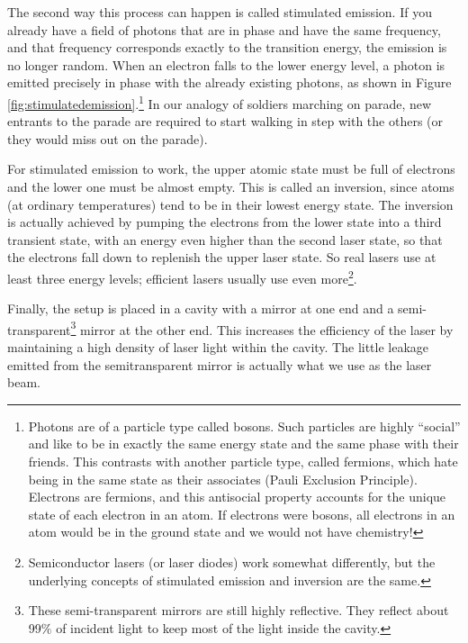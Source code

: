 The second way this process can happen is called stimulated emission. If you already have a field of photons that are in phase and have the same frequency, and that frequency corresponds exactly to the transition energy, the emission is no longer random. When an electron falls to the lower energy level, a photon is emitted precisely in phase with the already existing photons, as shown in Figure {\ref{fig:stimulatedemission}}.\footnote{Photons are of a particle type called bosons. Such particles are highly ``social'' and like to be in exactly the same energy state and the same phase with their friends. This contrasts with another particle type, called fermions, which hate being in the same state as their associates (Pauli Exclusion Principle). Electrons are fermions, and this antisocial property accounts for the unique state of each electron in an atom. If electrons were bosons, all electrons in an atom would be in the ground state and we would not have chemistry!} In our analogy of soldiers marching on parade, new entrants to the parade are required to start walking in step with the others (or they would miss out on the parade).\myskip

For stimulated emission to work, the upper atomic state must be full of electrons and the lower one must be almost empty. This is called an inversion, since atoms (at ordinary temperatures) tend to be in their lowest energy state. The inversion is actually achieved by pumping the electrons from the lower state into a third transient state, with an energy even higher than the second laser state, so that the electrons fall down to replenish the upper laser state. So real lasers use at least three energy levels; efficient lasers usually use even more\footnote{Semiconductor lasers (or laser diodes) work somewhat differently, but the underlying concepts of stimulated emission and inversion are the same.}.\myskip

Finally, the setup is placed in a cavity with a mirror at one end and a semi-transparent\footnote{These semi-transparent mirrors are still highly reflective. They reflect about 99$\%$ of incident light to keep most of the light inside the cavity.} mirror at the other end. This increases the efficiency of the laser by maintaining a high density of laser light within the cavity. The little leakage emitted from the semitransparent mirror is actually what we use as the laser beam.
